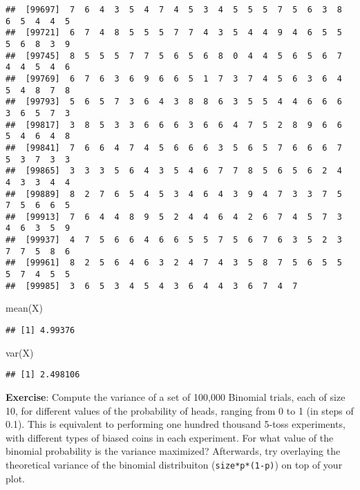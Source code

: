 \documentclass[
]{book}
\newenvironment{Shaded}{\begin{snugshade}}{\end{snugshade}}
\newcommand{\FunctionTok}[1]{\textcolor[rgb]{0.00,0.00,0.00}{#1}}
\newcommand{\NormalTok}[1]{#1}
\begin{document}
\begin{verbatim}
##  [99697]  7  6  4  3  5  4  7  4  5  3  4  5  5  5  7  5  6  3  8  6  5  4  4  5
##  [99721]  6  7  4  8  5  5  5  7  7  4  3  5  4  4  9  4  6  5  5  5  6  8  3  9
##  [99745]  8  5  5  5  7  7  5  6  5  6  8  0  4  4  5  6  5  6  7  4  4  5  4  6
##  [99769]  6  7  6  3  6  9  6  6  5  1  7  3  7  4  5  6  3  6  4  5  4  8  7  8
##  [99793]  5  6  5  7  3  6  4  3  8  8  6  3  5  5  4  4  6  6  6  3  6  5  7  3
##  [99817]  3  8  5  3  3  6  6  6  3  6  6  4  7  5  2  8  9  6  6  5  4  6  4  8
##  [99841]  7  6  6  4  7  4  5  6  6  6  3  5  6  5  7  6  6  6  7  5  3  7  3  3
##  [99865]  3  3  3  5  6  4  3  5  4  6  7  7  8  5  6  5  6  2  4  4  3  3  4  4
##  [99889]  8  2  7  6  5  4  5  3  4  6  4  3  9  4  7  3  3  7  5  7  5  6  6  5
##  [99913]  7  6  4  4  8  9  5  2  4  4  6  4  2  6  7  4  5  7  3  4  6  3  5  9
##  [99937]  4  7  5  6  6  4  6  6  5  5  7  5  6  7  6  3  5  2  3  7  7  5  8  6
##  [99961]  8  2  5  6  4  6  3  2  4  7  4  3  5  8  7  5  6  5  5  5  7  4  5  5
##  [99985]  3  6  5  3  4  5  4  3  6  4  4  3  6  7  4  7
\end{verbatim}

\begin{Shaded}
\begin{Highlighting}[]
\FunctionTok{mean}\NormalTok{(X)}
\end{Highlighting}
\end{Shaded}

\begin{verbatim}
## [1] 4.99376
\end{verbatim}

\begin{Shaded}
\begin{Highlighting}[]
\FunctionTok{var}\NormalTok{(X)}
\end{Highlighting}
\end{Shaded}

\begin{verbatim}
## [1] 2.498106
\end{verbatim}

\textbf{Exercise}: Compute the variance of a set of 100,000 Binomial trials, each of size 10, for different values of the probability of heads, ranging from 0 to 1 (in steps of 0.1). This is equivalent to performing one hundred thousand 5-toss experiments, with different types of biased coins in each experiment. For what value of the binomial probability is the variance maximized? Afterwards, try overlaying the theoretical variance of the binomial distribuiton (\texttt{size*p*(1-p)}) on top of your plot.
\end{document}
